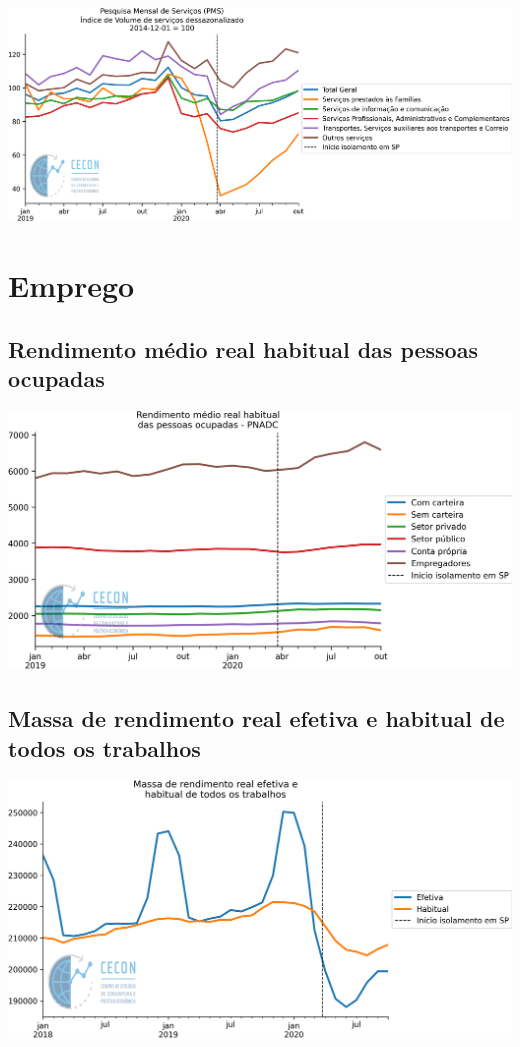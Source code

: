 \documentclass{SelfArx}
\begin{document}
\begin{center}
\includegraphics[width=.9\linewidth]{./figs/Setoriais/PMS_IBGE.png}
\end{center}

\section*{Emprego}
\label{sec:orgda31552}

\subsection*{Rendimento médio real habitual das pessoas ocupadas}
\label{sec:org78ddda6}


\begin{center}
\includegraphics[width=.9\linewidth]{./figs/Emprego/RMHPO.png}
\end{center}

\subsection*{Massa de rendimento real efetiva e habitual de todos os trabalhos}
\label{sec:orgc45a33a}

\begin{center}
\includegraphics[width=.9\linewidth]{./figs/Emprego/MRR_Efetiva_Habitual.png}
\end{center}
\end{document}
